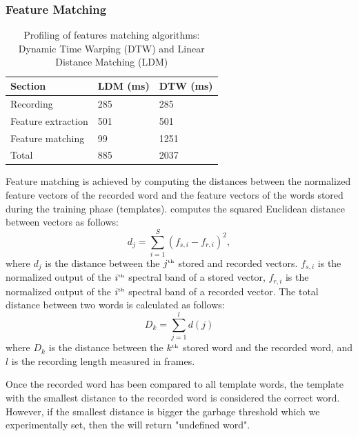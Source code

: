 \subsubsection{Feature Matching}
\begin{table}
	\centering
	\caption{Profiling of features matching algorithms: Dynamic Time Warping (DTW) and Linear Distance Matching (LDM)}
	\label{tab:profiling}
	\begin{tabular}{lll} \hline
	Section & LDM (ms) & DTW (ms) \\\hline
	Recording & 285  & 285 \\
	Feature extraction & 501 & 501 \\
	Feature matching &  99 & 1251 \\\hline
	Total & 885 & 2037 \\\hline
	\end{tabular}
\end{table}
%
Feature matching is achieved by computing the distances between the normalized feature vectors of the recorded word and the feature vectors of the words stored during the training phase (templates). 
\cim computes the squared Euclidean distance between vectors as follows:
\begin{equation}
	 	d_j = \sum\limits^S_{i=1} (f_{s,i} - f_{r,i})^2,
    \label{eq:frame_dist}
\end{equation}
where $d_j$ is the distance between the $j^{\text{\tiny th}}$ stored and recorded vectors. $f_{s,i}$ is the normalized output of the $i^{\text{\tiny th}}$ spectral band of a stored vector, $f_{r,i}$ is the normalized output of the $i^{\text{\tiny th}}$ spectral band of a recorded vector. 
The total distance between two words is calculated as follows:
\begin{equation}
		D_k = \sum\limits^{l}_{j=1} d(j)
\end{equation}
where $D_k$ is the distance between the $k^{\text{\tiny th}}$ stored word and the recorded word, and $l$ is the recording length measured in frames.

Once the recorded word has been compared to all \cim template words, the template with the smallest distance to the recorded word is considered the correct word. However, if the smallest distance is bigger the garbage threshold which we experimentally set, then the \cim will return "undefined word". 

